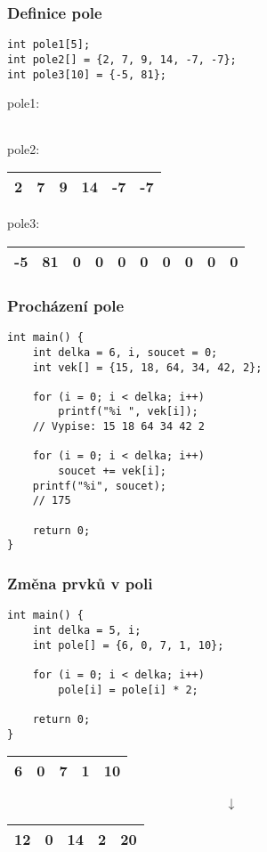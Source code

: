 \documentclass{beamer}
\begin{document}
\begin{frame}[t,fragile]\frametitle{Definice pole} 
\begin{verbatim} 
int pole1[5];
int pole2[] = {2, 7, 9, 14, -7, -7};
int pole3[10] = {-5, 81};
\end{verbatim}

\vskip 5mm
pole1:
\begin{tabular}{|p{4mm}|p{4mm}|p{4mm}|p{4mm}|p{4mm}|}
\hline & & & & \\\hline
\end{tabular}

\vskip 5mm
pole2:
\begin{tabular}{|p{4mm}|p{4mm}|p{4mm}|p{4mm}|p{4mm}|p{4mm}|}
\hline 2& 7& 9& 14& -7 & -7\\\hline
\end{tabular}

\vskip 5mm
pole3:
\begin{tabular}{|p{4mm}|p{4mm}|p{4mm}|p{4mm}|p{4mm}|p{4mm}|p{4mm}|p{4mm}|p{4mm}|p{4mm}|}
\hline -5&81&0&0&0&0&0&0&0&0 \\\hline
\end{tabular}
\end{frame}



\begin{frame}[t,fragile]\frametitle{Procházení pole} 
\begin{verbatim} 
int main() {
    int delka = 6, i, soucet = 0;
    int vek[] = {15, 18, 64, 34, 42, 2};

    for (i = 0; i < delka; i++)
        printf("%i ", vek[i]);
    // Vypise: 15 18 64 34 42 2 

    for (i = 0; i < delka; i++) 
        soucet += vek[i];
    printf("%i", soucet);
    // 175

    return 0;     
}
\end{verbatim}
\end{frame}


\begin{frame}[t,fragile]\frametitle{Změna prvků v poli} 
\begin{verbatim} 
int main() {
    int delka = 5, i;
    int pole[] = {6, 0, 7, 1, 10};

    for (i = 0; i < delka; i++) 
        pole[i] = pole[i] * 2;

    return 0;     
}
\end{verbatim}
\begin{center}
\begin{tabular}{|c|c|c|c|c|}
\hline 6&0&7&1&10 \\\hline
\end{tabular}
$$
\downarrow
$$
\begin{tabular}{|c|c|c|c|c|}
\hline 12&0&14&2&20 \\\hline
\end{tabular}
\end{center}

\end{frame}
\end{document}
